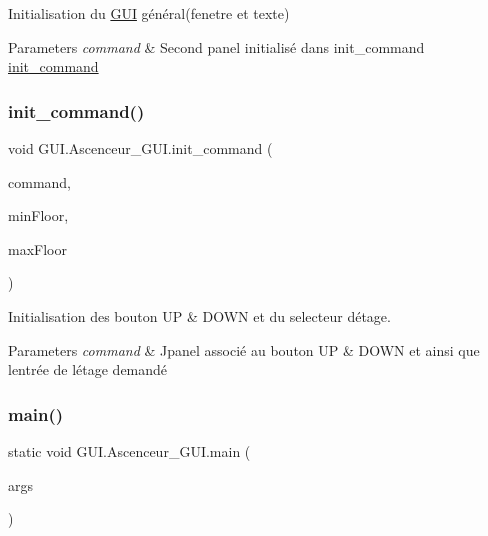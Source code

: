 Initialisation du \mbox{\hyperlink{namespace_g_u_i}{G\+UI}} général(fenetre et texte) 
\begin{DoxyParams}{Parameters}
{\em command} & Second panel initialisé dans init\+\_\+command \mbox{\hyperlink{class_g_u_i_1_1_ascenceur___g_u_i_a5f574e8e2efb677ad7e6db424156cb6b}{init\+\_\+command}} \\
\hline
\end{DoxyParams}
\mbox{\label{class_g_u_i_1_1_ascenceur___g_u_i_a5f574e8e2efb677ad7e6db424156cb6b}} 
\subsubsection{\texorpdfstring{init\_command()}{init\_command()}}
{\footnotesize\ttfamily void G\+U\+I.\+Ascenceur\+\_\+\+G\+U\+I.\+init\+\_\+command (\begin{DoxyParamCaption}\item[{J\+Panel}]{command,  }\item[{int}]{min\+Floor,  }\item[{int}]{max\+Floor }\end{DoxyParamCaption})\hspace{0.3cm}{\ttfamily [private]}}

Initialisation des bouton UP \& D\+O\+WN et du selecteur d\textquotesingle{}étage. 
\begin{DoxyParams}{Parameters}
{\em command} & Jpanel associé au bouton UP \& D\+O\+WN et ainsi que l\textquotesingle{}entrée de l\textquotesingle{}étage demandé \\
\hline
\end{DoxyParams}
\mbox{\label{class_g_u_i_1_1_ascenceur___g_u_i_aed016f8cca79137b58b3452229b3f273}} 
\subsubsection{\texorpdfstring{main()}{main()}}
{\footnotesize\ttfamily static void G\+U\+I.\+Ascenceur\+\_\+\+G\+U\+I.\+main (\begin{DoxyParamCaption}\item[{String \mbox{[}$\,$\mbox{]}}]{args }\end{DoxyParamCaption})\hspace{0.3cm}{\ttfamily [static]}}

